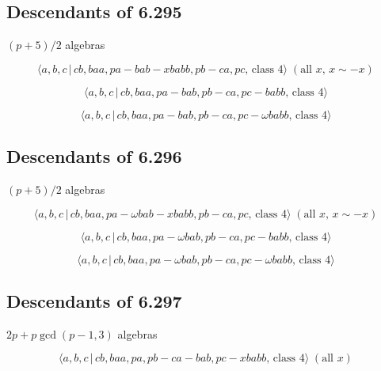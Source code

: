 \documentclass[10pt]{article}
\begin{document}
\subsection{Descendants of 6.295}

$(p+5)/2$ algebras

\begin{equation}
\langle a,b,c\,|\,cb,baa,pa-bab-xbabb,pb-ca,pc,\,\text{class }4\rangle \;(%
\text{all }x,\,x\sim -x)  \tag{7.2333}
\end{equation}

\begin{equation}
\langle a,b,c\,|\,cb,baa,pa-bab,pb-ca,pc-babb,\,\text{class }4\rangle 
\tag{7.2334}
\end{equation}

\begin{equation}
\langle a,b,c\,|\,cb,baa,pa-bab,pb-ca,pc-\omega babb,\,\text{class }4\rangle
\tag{7.2335}
\end{equation}

\subsection{Descendants of 6.296}

$(p+5)/2$ algebras

\begin{equation}
\langle a,b,c\,|\,cb,baa,pa-\omega bab-xbabb,pb-ca,pc,\,\text{class }%
4\rangle \;(\text{all }x,\,x\sim -x)  \tag{7.2336}
\end{equation}

\begin{equation}
\langle a,b,c\,|\,cb,baa,pa-\omega bab,pb-ca,pc-babb,\,\text{class }4\rangle
\tag{7.2337}
\end{equation}

\begin{equation}
\langle a,b,c\,|\,cb,baa,pa-\omega bab,pb-ca,pc-\omega babb,\,\text{class }%
4\rangle  \tag{7.2338}
\end{equation}

\subsection{Descendants of 6.297}

$2p+p\gcd (p-1,3)$ algebras

\begin{equation}
\langle a,b,c\,|\,cb,baa,pa,pb-ca-bab,pc-xbabb,\,\text{class }4\rangle \;(%
\text{all }x)  \tag{7.2339}
\end{equation}
\end{document}
